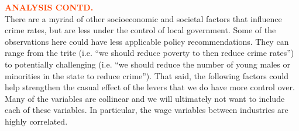 \pagebreak
\textbf{\textcolor{OrangeRed}{ANALYSIS CONTD.}}\\

There are a myriad of other socioeconomic and societal factors that influence crime rates, but are less under the control of local government. Some of the observations here could have less applicable policy recommendations. They can range from the trite (i.e. “we should reduce poverty to then reduce crime rates”) to potentially challenging (i.e. “we should reduce the number of young males or minorities in the state to reduce crime”). That said, the following factors could help strengthen the casual effect of the levers that we do have more control over. Many of the variables are collinear and we will ultimately not want to include each of these variables. In particular, the wage variables between industries are highly correlated. \\

